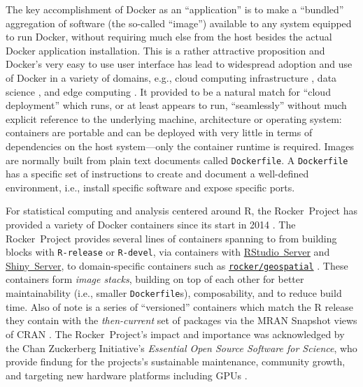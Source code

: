 The key accomplishment of Docker as an ``application'' is to make a
``bundled'' aggregation of software (the so-called ``image'') available
to any system equipped to run Docker, without requiring much else from
the host besides the actual Docker application installation. This is a
rather attractive proposition and Docker's very easy to use user
interface has lead to widespread adoption and use of Docker in a variety
of domains, e.g., cloud computing infrastructure
\citep[e.g.,][]{Bernstein2014}, data science
\citep[e.g.,][]{boettiger_introduction_2015}, and edge computing
\citep[e.g.,][]{alam_orchestration_2018}. It provided to be a natural
match for ``cloud deployment'' which runs, or at least appears to run,
``seamlessly'' without much explicit reference to the underlying
machine, architecture or operating system: containers are portable and
can be deployed with very little in terms of dependencies on the host
system---only the container runtime is required. Images are normally
built from plain text documents called \texttt{Dockerfile}. A
\texttt{Dockerfile} has a specific set of instructions to create and
document a well-defined environment, i.e., install specific software and
expose specific ports.

For statistical computing and analysis centered around R, the
Rocker~Project has provided a variety of Docker containers since its
start in 2014 \citep{RJ-2017-065}. The Rocker~Project provides several
lines of containers spanning to from building blocks with
\texttt{R-release} or \texttt{R-devel}, via containers with
\href{https://rstudio.com/products/rstudio/}{RStudio~Server} and
\href{https://rstudio.com/products/shiny/shiny-server/}{Shiny~Server},
to domain-specific containers such as
\href{https://github.com/rocker-org/geospatial}{\texttt{rocker/geospatial}}
\citep{rocker_geospatial_2019}. These containers form \emph{image
stacks}, building on top of each other for better maintainability (i.e.,
smaller \texttt{Dockerfile}s), composability, and to reduce build time.
Also of note is a series of ``versioned'' containers which match the R
release they contain with the \emph{then-current} set of packages via
the MRAN Snapshot views of CRAN \citep{microsoft_cran_2019}. The
Rocker~Project's impact and importance was acknowledged by the Chan
Zuckerberg Initiative's \emph{Essential Open Source Software for
Science}, who provide findung for the projects's sustainable
maintenance, community growth, and targeting new hardware platforms
including GPUs \citep{chan_zuckerberg_initiative_maintaining_2019}.

